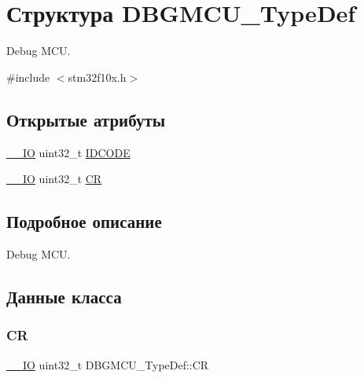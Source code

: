 \hypertarget{struct_d_b_g_m_c_u___type_def}{}\section{Структура D\+B\+G\+M\+C\+U\+\_\+\+Type\+Def}
\label{struct_d_b_g_m_c_u___type_def}


Debug M\+CU.  




{\ttfamily \#include $<$stm32f10x.\+h$>$}

\subsection*{Открытые атрибуты}
\begin{DoxyCompactItemize}
\item 
\mbox{\hyperlink{group___c_m_s_i_s___c_m3__core__definitions_gaec43007d9998a0a0e01faede4133d6be}{\+\_\+\+\_\+\+IO}} uint32\+\_\+t \mbox{\hyperlink{struct_d_b_g_m_c_u___type_def_a0cc3561c124d06bb57dfa855e43ed99f}{I\+D\+C\+O\+DE}}
\item 
\mbox{\hyperlink{group___c_m_s_i_s___c_m3__core__definitions_gaec43007d9998a0a0e01faede4133d6be}{\+\_\+\+\_\+\+IO}} uint32\+\_\+t \mbox{\hyperlink{struct_d_b_g_m_c_u___type_def_a15981828f2b915d38570cf6684e99a53}{CR}}
\end{DoxyCompactItemize}


\subsection{Подробное описание}
Debug M\+CU. 

\subsection{Данные класса}
\mbox{\label{struct_d_b_g_m_c_u___type_def_a15981828f2b915d38570cf6684e99a53}} 
\subsubsection{\texorpdfstring{CR}{CR}}
{\footnotesize\ttfamily \mbox{\hyperlink{group___c_m_s_i_s___c_m3__core__definitions_gaec43007d9998a0a0e01faede4133d6be}{\+\_\+\+\_\+\+IO}} uint32\+\_\+t D\+B\+G\+M\+C\+U\+\_\+\+Type\+Def\+::\+CR}

\mbox{\label{struct_d_b_g_m_c_u___type_def_a0cc3561c124d06bb57dfa855e43ed99f}} 
